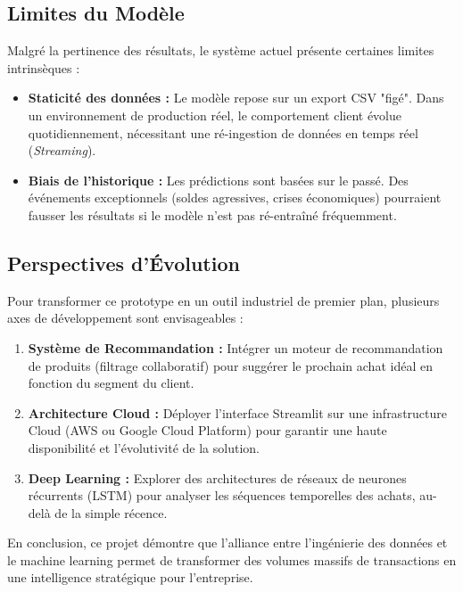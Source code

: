 \documentclass[11pt,a4paper]{article}
\begin{document}
\subsection*{Limites du Modèle}
Malgré la pertinence des résultats, le système actuel présente certaines limites intrinsèques :
\begin{itemize}
    \item \textbf{Staticité des données :} Le modèle repose sur un export CSV "figé". Dans un environnement de production réel, le comportement client évolue quotidiennement, nécessitant une ré-ingestion de données en temps réel (\textit{Streaming}).
    \item \textbf{Biais de l'historique :} Les prédictions sont basées sur le passé. Des événements exceptionnels (soldes agressives, crises économiques) pourraient fausser les résultats si le modèle n'est pas ré-entraîné fréquemment.
\end{itemize}

\subsection*{Perspectives d'Évolution}
Pour transformer ce prototype en un outil industriel de premier plan, plusieurs axes de développement sont envisageables :
\begin{enumerate}
    \item \textbf{Système de Recommandation :} Intégrer un moteur de recommandation de produits (filtrage collaboratif) pour suggérer le prochain achat idéal en fonction du segment du client.
    \item \textbf{Architecture Cloud :} Déployer l'interface Streamlit sur une infrastructure Cloud (AWS ou Google Cloud Platform) pour garantir une haute disponibilité et l'évolutivité de la solution.
    \item \textbf{Deep Learning :} Explorer des architectures de réseaux de neurones récurrents (LSTM) pour analyser les séquences temporelles des achats, au-delà de la simple récence.
\end{enumerate}

\vspace{1cm}
En conclusion, ce projet démontre que l'alliance entre l'ingénierie des données et le machine learning permet de transformer des volumes massifs de transactions en une intelligence stratégique pour l'entreprise.
\end{document}

